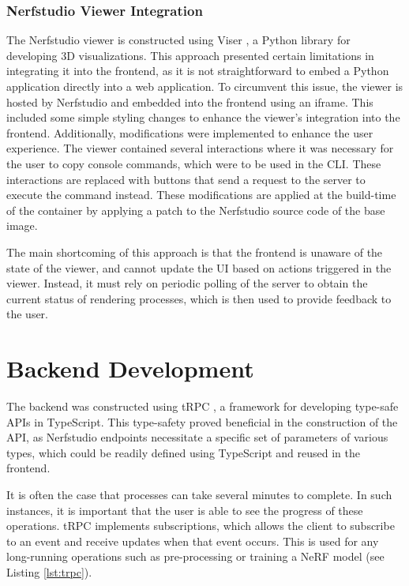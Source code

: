 \subsubsection{Nerfstudio Viewer Integration}

The Nerfstudio viewer is constructed using Viser \cite{noauthor_nerfstudio-projectviser_2024}, a Python library for developing 3D visualizations.
This approach presented certain limitations in integrating it into the frontend, as it is not straightforward to embed a Python application directly into a web application.
To circumvent this issue, the viewer is hosted by Nerfstudio and embedded into the frontend using an iframe.
This included some simple styling changes to enhance the viewer's integration into the frontend.
Additionally, modifications were implemented to enhance the user experience.
The viewer contained several interactions where it was necessary for the user to copy console commands, which were to be used in the CLI.
These interactions are replaced with buttons that send a request to the server to execute the command instead. 
These modifications are applied at the build-time of the container by applying a patch to the Nerfstudio source code of the base image.

The main shortcoming of this approach is that the frontend is unaware of the state of the viewer, and cannot update the UI based on actions triggered in the viewer.
Instead, it must rely on periodic polling of the server to obtain the current status of rendering processes, which is then used to provide feedback to the user.

\section{Backend Development}
\label{sec:system:backend}

The backend was constructed using tRPC \cite{noauthor_trpc_nodate}, a framework for developing type-safe APIs in TypeScript.
This type-safety proved beneficial in the construction of the API, as Nerfstudio endpoints necessitate a specific set of parameters of various types, which could be readily defined using TypeScript and reused in the frontend.

It is often the case that processes can take several minutes to complete.
In such instances, it is important that the user is able to see the progress of these operations.
tRPC implements subscriptions, which allows the client to subscribe to an event and receive updates when that event occurs.
This is used for any long-running operations such as pre-processing or training a NeRF model (see Listing \ref{lst:trpc}).


